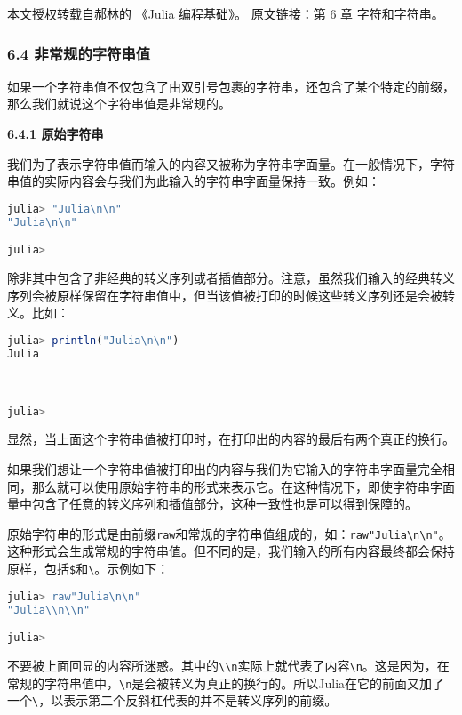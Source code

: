 
本文授权转载自郝林的 《Julia 编程基础》。 原文链接：\href{https://github.com/hyper0x/JuliaBasics/blob/master/book/ch06.md}{第 6 章 字符和字符串}。


\subsubsection{6.4 非常规的字符串值}

如果一个字符串值不仅包含了由双引号包裹的字符串，还包含了某个特定的前缀，那么我们就说这个字符串值是非常规的。

\textbf{6.4.1 原始字符串}

我们为了表示字符串值而输入的内容又被称为字符串字面量。在一般情况下，字符串值的实际内容会与我们为此输入的字符串字面量保持一致。例如：
\begin{lstlisting}[language=julia]
julia> "Julia\n\n"
"Julia\n\n"

julia> 
\end{lstlisting}

除非其中包含了非经典的转义序列或者插值部分。注意，虽然我们输入的经典转义序列会被原样保留在字符串值中，但当该值被打印的时候这些转义序列还是会被转义。比如：
\begin{lstlisting}[language=julia]
julia> println("Julia\n\n")
Julia



julia> 
\end{lstlisting}

显然，当上面这个字符串值被打印时，在打印出的内容的最后有两个真正的换行。

如果我们想让一个字符串值被打印出的内容与我们为它输入的字符串字面量完全相同，那么就可以使用原始字符串的形式来表示它。在这种情况下，即使字符串字面量中包含了任意的转义序列和插值部分，这种一致性也是可以得到保障的。

原始字符串的形式是由前缀\verb`raw`和常规的字符串值组成的，如：\verb`raw"Julia\n\n"`。这种形式会生成常规的字符串值。但不同的是，我们输入的所有内容最终都会保持原样，包括\verb`$`和\verb`\`。示例如下：
\begin{lstlisting}[language=julia]
julia> raw"Julia\n\n"
"Julia\\n\\n"

julia> 
\end{lstlisting}

不要被上面回显的内容所迷惑。其中的\verb`\\n`实际上就代表了内容\verb`\n`。这是因为，在常规的字符串值中，\verb`\n`是会被转义为真正的换行的。所以Julia在它的前面又加了一个\verb`\`，以表示第二个反斜杠代表的并不是转义序列的前缀。


